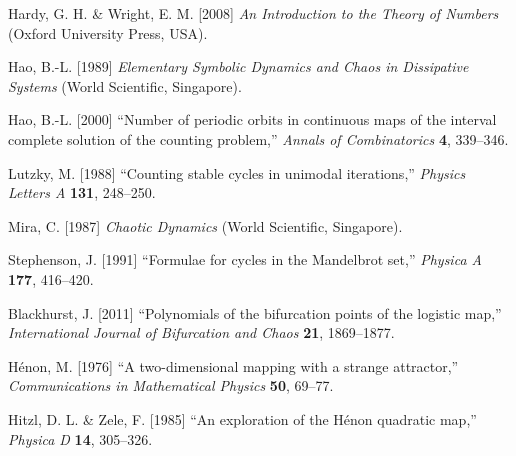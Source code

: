\documentclass{ws-ijbc}
\begin{document}
\begin{thebibliography}{50}
  Hardy, G. H. \& Wright, E. M. [2008]
  {\it An Introduction to the Theory of Numbers}
  (Oxford University Press, USA).

  Hao, B.-L. [1989]
  {\it Elementary Symbolic Dynamics and Chaos in  Dissipative Systems}
  (World Scientific, Singapore).

  Hao, B.-L. [2000]
  ``Number of periodic orbits in continuous maps of
  the interval complete solution of the counting problem,''
  {\it Annals of Combinatorics}
  \textbf{4},
  339--346.

  Lutzky, M. [1988]
  ``Counting stable cycles in unimodal iterations,''
  {\it Physics Letters A}
  \textbf{131},
  248--250.

  Mira, C. [1987]
  {\it Chaotic Dynamics}
  (World Scientific, Singapore).

  Stephenson, J. [1991]
  ``Formulae for cycles in the Mandelbrot set,''
  {\it Physica A}
  \textbf{177},
  416--420.

  Blackhurst, J. [2011]
  ``Polynomials of the bifurcation points of the logistic map,''
  {\it International Journal of Bifurcation and Chaos}
  \textbf{21},
  1869--1877.

  H\'enon, M. [1976]
  ``A two-dimensional mapping with a strange attractor,''
  {\it Communications in Mathematical Physics}
  \textbf{50},
  69--77.

  Hitzl, D. L. \& Zele, F. [1985]
  ``An exploration of the H\'enon quadratic map,''
  {\it Physica D}
  \textbf{14},
  305--326.

\end{thebibliography}
\end{document}
